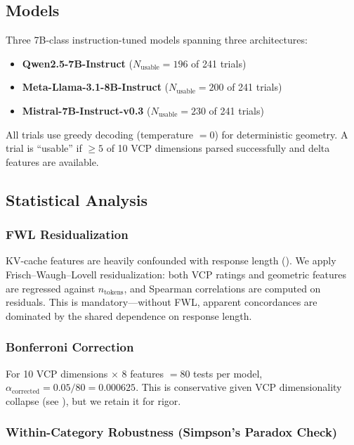 \documentclass[11pt,a4paper]{article}
\begin{document}
\subsection{Models}

Three 7B-class instruction-tuned models spanning three architectures:

\begin{itemize}
    \item \textbf{Qwen2.5-7B-Instruct} ($N_{\text{usable}} = 196$ of 241 trials)
    \item \textbf{Meta-Llama-3.1-8B-Instruct} ($N_{\text{usable}} = 200$ of 241 trials)
    \item \textbf{Mistral-7B-Instruct-v0.3} ($N_{\text{usable}} = 230$ of 241 trials)
\end{itemize}

All trials use greedy decoding (temperature $= 0$) for deterministic geometry. A trial is ``usable'' if $\geq 5$ of 10 VCP dimensions parsed successfully and delta features are available.

\subsection{Statistical Analysis}

\subsubsection{FWL Residualization}

KV-cache features are heavily confounded with response length (). We apply Frisch--Waugh--Lovell residualization: both VCP ratings and geometric features are regressed against $n_{\text{tokens}}$, and Spearman correlations are computed on residuals. This is mandatory---without FWL, apparent concordances are dominated by the shared dependence on response length.

\subsubsection{Bonferroni Correction}

For 10 VCP dimensions $\times$ 8 features $= 80$ tests per model, $\alpha_{\text{corrected}} = 0.05 / 80 = 0.000625$. This is conservative given VCP dimensionality collapse (see ), but we retain it for rigor.

\subsubsection{Within-Category Robustness (Simpson's Paradox Check)}
\end{document}
